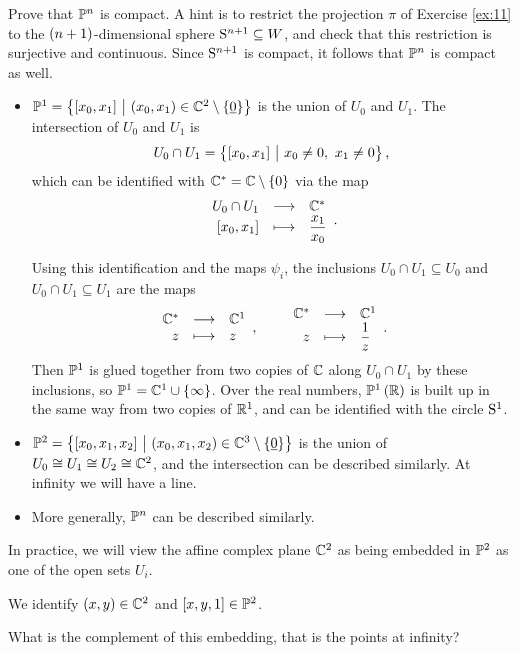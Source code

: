 \begin{exercise**}
\label{ex:12}
Prove that $ \PP^n $ is compact. A hint is to restrict the projection $ \pi $ of Exercise \ref{ex:11} to the $ \br{n + 1} $-dimensional sphere $ \S^{n + 1} \subseteq W $, and check that this restriction is surjective and continuous. Since $ \S^{n + 1} $ is compact, it follows that $ \PP^n $ is compact as well.
\end{exercise**}

\begin{example}
\hfill
\begin{itemize}
\item $ \PP^1 = \cbr{\sbr{x_0, x_1} \st \br{x_0, x_1} \in \CC^2 \setminus \cbr{\underline{0}}} $ is the union of $ U_0 $ and $ U_1 $. The intersection of $ U_0 $ and $ U_1 $ is
$$ U_0 \cap U_1 = \cbr{\sbr{x_0, x_1} \st x_0 \ne 0, \ x_1 \ne 0}, $$
which can be identified with $ \CC^* = \CC \setminus \cbr{0} $ via the map
$$ \function{U_0 \cap U_1}{\CC^*}{\sbr{x_0, x_1}}{\dfrac{x_1}{x_0}}. $$

\pagebreak

Using this identification and the maps $ \psi_i $, the inclusions $ U_0 \cap U_1 \subseteq U_0 $ and $ U_0 \cap U_1 \subseteq U_1 $ are the maps
$$ \function{\CC^*}{\CC^1}{z}{z}, \qquad \function{\CC^*}{\CC^1}{z}{\dfrac{1}{z}}. $$
Then $ \PP^1 $ is glued together from two copies of $ \CC $ along $ U_0 \cap U_1 $ by these inclusions, so $ \PP^1 = \CC^1 \cup \cbr{\infty} $. Over the real numbers, $ \PP^1\br{\RR} $ is built up in the same way from two copies of $ \RR^1 $, and can be identified with the circle $ \S^1 $.
\item $ \PP^2 = \cbr{\sbr{x_0, x_1, x_2} \st \br{x_0, x_1, x_2} \in \CC^3 \setminus \cbr{\underline{0}}} $ is the union of $ U_0 \cong U_1 \cong U_2 \cong \CC^2 $, and the intersection can be described similarly. At infinity we will have a line.
\item More generally, $ \PP^n $ can be described similarly.
\end{itemize}
\end{example}

In practice, we will view the affine complex plane $ \CC^2 $ as being embedded in $ \PP^2 $ as one of the open sets $ U_i $.

\begin{example*}
We identify $ \br{x, y} \in \CC^2 $ and $ \sbr{x, y, 1} \in \PP^2 $.
\end{example*}

What is the complement of this embedding, that is the points at infinity?

